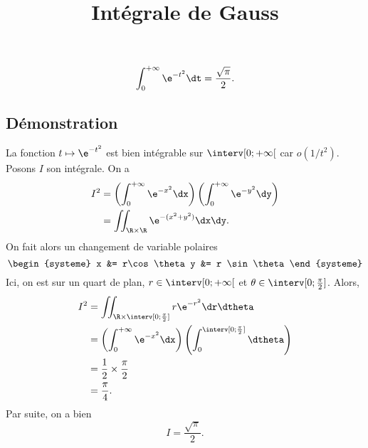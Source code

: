 \documentclass[fontsize=12pt,twoside=false,parskip=half, french]{scrartcl}
\title{Intégrale de Gauss}
\date{}
\author{}
\begin{document}
\maketitle
   \begin{Theoreme}
      \[
         \int_0^{+\infty} \e^{-t^2} \dt = \frac{\sqrt{\pi}}{2}.
      \]
   \end{Theoreme}
   \subsection{Démonstration}
      La fonction $t \mapsto \e^{-t^2}$ est bien intégrable sur $\interv[0; +\infty[$ car $o(1/t^2)$.
      Posons $I$ son intégrale. On a 
      \begin{align*}
         I^2 &= \left( \int_0^{+\infty} \e^{-x^2} \dx \right) \left( \int_0^{+\infty} \e^{-y^2} \dy \right) \\
             &= \iint_{\R \times \R} \e^{-(x^2 + y^2)} \dx \dy.
      \end{align*}
      On fait alors un changement de variable polaires
      \[
         \begin{systeme}
            x &= r\cos \theta
            y &= r \sin \theta
         \end{systeme}
      \]
      Ici, on est sur un quart de plan, $r \in \interv[0; +\infty[$ et $\theta \in \interv[0; \frac{\pi}{2}]$. Alors,
      \begin{align*}
         I^2 &= \iint_{\R \times \interv[0; \frac{\pi}{2}]} r \e^{-r^2} \dr \dtheta\\
             &= \left( \int_0^{+\infty} \e^{-x^2} \dx \right) \left( \int_0^{\interv[0; \frac{\pi}{2}]} \dtheta \right)\\
             &= \frac{1}{2} \times \frac{\pi}{2}\\
             &= \frac{\pi}{4}.
      \end{align*}
      Par suite, on a bien
      \[
         I = \frac{\sqrt{\pi}}{2}.
      \]
\end{document}
